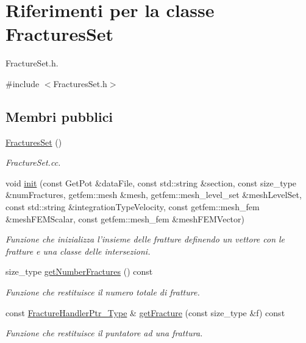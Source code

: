 \hypertarget{classFracturesSet}{\section{Riferimenti per la classe Fractures\-Set}
\label{classFracturesSet}
}


Fracture\-Set.\-h.  




{\ttfamily \#include $<$Fractures\-Set.\-h$>$}

\subsection*{Membri pubblici}
\begin{DoxyCompactItemize}
\item 
\hyperlink{classFracturesSet_a01682537586e273be19fd789c99cfa87}{Fractures\-Set} ()
\begin{DoxyCompactList}\small\item\em Fracture\-Set.\-cc. \end{DoxyCompactList}\item 
void \hyperlink{classFracturesSet_a451f55adca2cd36076294c3c3d2d5b6d}{init} (const Get\-Pot \&data\-File, const std\-::string \&section, const size\-\_\-type \&num\-Fractures, getfem\-::mesh \&mesh, getfem\-::mesh\-\_\-level\-\_\-set \&mesh\-Level\-Set, const std\-::string \&integration\-Type\-Velocity, const getfem\-::mesh\-\_\-fem \&mesh\-F\-E\-M\-Scalar, const getfem\-::mesh\-\_\-fem \&mesh\-F\-E\-M\-Vector)
\begin{DoxyCompactList}\small\item\em Funzione che inizializza l'insieme delle fratture definendo un vettore con le fratture e una classe delle intersezioni. \end{DoxyCompactList}\item 
size\-\_\-type \hyperlink{classFracturesSet_ad0d608408d6b65c83c2eb013d4daacdf}{get\-Number\-Fractures} () const 
\begin{DoxyCompactList}\small\item\em Funzione che restituisce il numero totale di fratture. \end{DoxyCompactList}\item 
const \hyperlink{FractureHandler_8h_af23fb7a30aaff864bd42587af4f1e78a}{Fracture\-Handler\-Ptr\-\_\-\-Type} \& \hyperlink{classFracturesSet_afa7100ac44d32e51e193380bf6d9d5f9}{get\-Fracture} (const size\-\_\-type \&f) const 
\begin{DoxyCompactList}\small\item\em Funzione che restituisce il puntatore ad una frattura. \end{DoxyCompactList}\item 

\end{DoxyCompactItemize}
